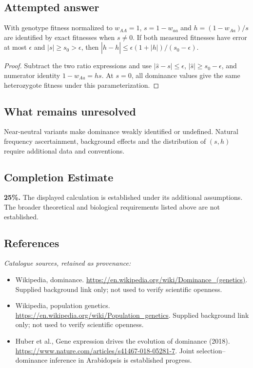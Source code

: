 \documentclass[11pt]{article}
\begin{document}
\subsection{Attempted answer}
\begin{proposition}
With genotype fitness normalized to $w_{AA}=1$, $s=1-w_{aa}$ and $h=(1-w_{Aa})/s$ are identified by exact fitnesses when $s\ne0$. If both measured fitnesses have error at most $\epsilon$ and $|s|\geq s_0>\epsilon$, then $|\widehat h-h|\leq\epsilon(1+|h|)/(s_0-\epsilon)$.
\end{proposition}
\begin{proof}
Subtract the two ratio expressions and use $|\widehat s-s|\leq\epsilon$, $|\widehat s|\geq s_0-\epsilon$, and numerator identity $1-w_{Aa}=hs$. At $s=0$, all dominance values give the same heterozygote fitness under this parameterization.
\end{proof}
\subsection{What remains unresolved}
Near-neutral variants make dominance weakly identified or undefined. Natural frequency ascertainment, background effects and the distribution of $(s,h)$ require additional data and conventions.
\subsection{Completion Estimate}
\textbf{25\%.} The displayed calculation is established under its additional assumptions. The broader theoretical and biological requirements listed above are not established.
\subsection{References}
\noindent\emph{Catalogue sources, retained as provenance:}
\begin{itemize}
\item Wikipedia, dominance. \url{https://en.wikipedia.org/wiki/Dominance_(genetics)}. Supplied background link only; not used to verify scientific openness.
\item Wikipedia, population genetics. \url{https://en.wikipedia.org/wiki/Population_genetics}. Supplied background link only; not used to verify scientific openness.
\item Huber et al., Gene expression drives the evolution of dominance (2018). \url{https://www.nature.com/articles/s41467-018-05281-7}. Joint selection--dominance inference in Arabidopsis is established progress.
\end{itemize}
\end{document}
